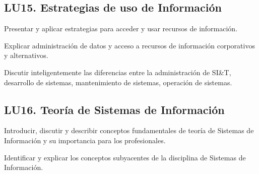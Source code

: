 \subsection{LU15. Estrategias de uso de Información}\label{sec:LU15}
\begin{LearningUnit}
\begin{LUGoal}
\item Presentar y aplicar estrategias para acceder y usar recursos de información.
\end{LUGoal}

\begin{LUObjective}
\item Explicar administración de datos y acceso a recursos de información corporativos y alternativos.
\item Discutir inteligentemente las diferencias entre la administración de SI\&T, desarrollo de sistemas, mantenimiento de sistemas, operación de sistemas.
\end{LUObjective}
\end{LearningUnit}

\subsection{LU16. Teoría de Sistemas de Información}\label{sec:LU16}
\begin{LearningUnit}
\begin{LUGoal}
\item Introducir, discutir y describir conceptos fundamentales de teoría de Sistemas de Información y su importancia para los profesionales.
\end{LUGoal}

\begin{LUObjective}
\item Identificar y explicar los conceptos subyacentes de la disciplina de Sistemas de Información.
\end{LUObjective}
\end{LearningUnit}

